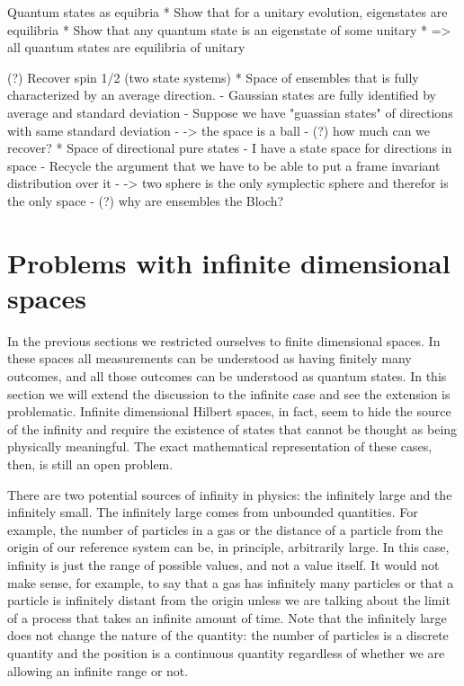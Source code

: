 Quantum states as equibria
* Show that for a unitary evolution, eigenstates are equilibria
* Show that any quantum state is an eigenstate of some unitary
* => all quantum states are equilibria of unitary

(?) Recover spin 1/2 (two state systems)
* Space of ensembles that is fully characterized by an average direction.
  - Gaussian states are fully identified by average and standard deviation
  - Suppose we have "guassian states" of directions with same standard deviation
  - -> the space is a ball
  - (?) how much can we recover?
* Space of directional pure states
  - I have a state space for directions in space
  - Recycle the argument that we have to be able to put a frame invariant distribution over it
  - -> two sphere is the only symplectic sphere and therefor is the only space
  - (?) why are ensembles the Bloch?

\section{Problems with infinite dimensional spaces}

In the previous sections we restricted ourselves to finite dimensional spaces. In these spaces all measurements can be understood as having finitely many outcomes, and all those outcomes can be understood as quantum states. In this section we will extend the discussion to the infinite case and see the extension is problematic. Infinite dimensional Hilbert spaces, in fact, seem to hide the source of the infinity and require the existence of states that cannot be thought as being physically meaningful. The exact mathematical representation of these cases, then, is still an open problem.

There are two potential sources of infinity in physics: the infinitely large and the infinitely small. The infinitely large comes from unbounded quantities. For example, the number of particles in a gas or the distance of a particle from the origin of our reference system can be, in principle, arbitrarily large. In this case, infinity is just the range of possible values, and not a value itself. It would not make sense, for example, to say that a gas has infinitely many particles or that a particle is infinitely distant from the origin unless we are talking about the limit of a process that takes an infinite amount of time. Note that the infinitely large does not change the nature of the quantity: the number of particles is a discrete quantity and the position is a continuous quantity regardless of whether we are allowing an infinite range or not.

